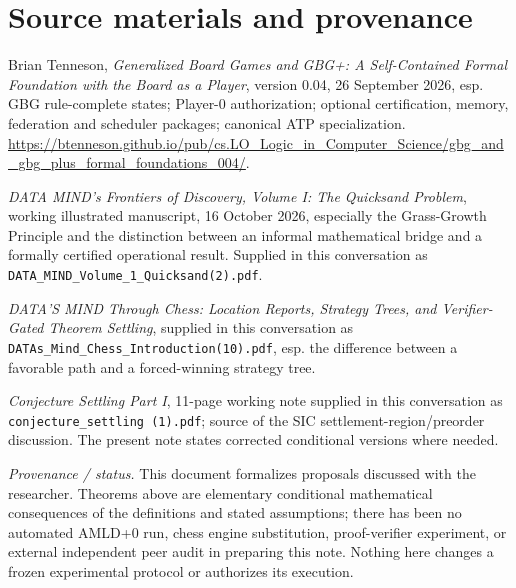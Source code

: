 \documentclass[11pt,letterpaper]{article}
\begin{document}
\section*{Source materials and provenance}
\small
\begin{enumerate}[label={[\arabic*]},leftmargin=2em]
\item Brian Tenneson, \emph{Generalized Board Games and GBG+: A Self-Contained Formal Foundation with the Board as a Player}, version 0.04, 26 September 2026, esp. GBG rule-complete states; Player-0 authorization; optional certification, memory, federation and scheduler packages; canonical ATP specialization. \url{https://btenneson.github.io/pub/cs.LO_Logic_in_Computer_Science/gbg_and_gbg_plus_formal_foundations_004/}.
\item \emph{DATA MIND's Frontiers of Discovery, Volume I: The Quicksand Problem}, working illustrated manuscript, 16 October 2026, especially the Grass-Growth Principle and the distinction between an informal mathematical bridge and a formally certified operational result. Supplied in this conversation as \texttt{DATA\_MIND\_Volume\_1\_Quicksand(2).pdf}.
\item \emph{DATA'S MIND Through Chess: Location Reports, Strategy Trees, and Verifier-Gated Theorem Settling}, supplied in this conversation as \texttt{DATAs\_Mind\_Chess\_Introduction(10).pdf}, esp. the difference between a favorable path and a forced-winning strategy tree.
\item \emph{Conjecture Settling Part I}, 11-page working note supplied in this conversation as \texttt{conjecture\_settling (1).pdf}; source of the SIC settlement-region/preorder discussion. The present note states corrected conditional versions where needed.
\end{enumerate}
\normalsize
\vspace{6pt}
{\small\textit{Provenance / status.} This document formalizes proposals discussed with the researcher. Theorems above are elementary conditional mathematical consequences of the definitions and stated assumptions; there has been no automated AMLD+0 run, chess engine substitution, proof-verifier experiment, or external independent peer audit in preparing this note. Nothing here changes a frozen experimental protocol or authorizes its execution.}
\end{document}
